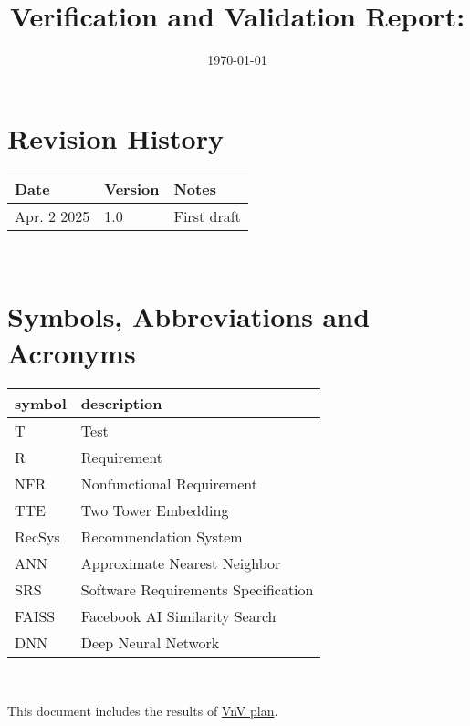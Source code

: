 \documentclass[12pt, titlepage]{article}
\begin{document}
\title{Verification and Validation Report: \progname} 
\author{\authname}
\date{\today}
	
\maketitle


\section{Revision History}

\begin{tabularx}{\textwidth}{p{3cm}p{2cm}X}
\toprule {\bf Date} & {\bf Version} & {\bf Notes}\\
\midrule
Apr. 2 2025 & 1.0 & First draft\\
\bottomrule
\end{tabularx}
\nocite{*}
~\newpage

\section{Symbols, Abbreviations and Acronyms}

\renewcommand{\arraystretch}{1.2}
\begin{tabular}{l l} 
  \toprule		
  \textbf{symbol} & \textbf{description}\\
  \midrule 
  T & Test\\
  R & Requirement\\
  NFR & Nonfunctional Requirement\\
  TTE & Two Tower Embedding\\
  RecSys & Recommendation System\\
  ANN & Approximate Nearest Neighbor\\
  SRS & Software Requirements Specification\\
  FAISS & Facebook AI Similarity Search\\
  DNN & Deep Neural Network\\
  \bottomrule
\end{tabular}\\


\newpage

\tableofcontents

\listoftables %

\newpage


This document includes the results of \href{https://github.com/V-AS/Two-tower-recommender-system/blob/main/docs/VnVPlan/VnVPlan.pdf}{VnV plan}.
\end{document}
